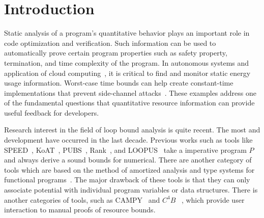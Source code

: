 \section{Introduction}
\label{sec:intro}

Static analysis of a program's quantitative behavior plays an important role in code optimization and verification. 
Such information can be used to automatically prove certain program properties such as safety property, termination, and time complexity of the program. 
In autonomous systems and application of cloud computing~\cite{Carroll:2010:APC:1855840.1855861,Cohen:2012:ET:2398857.2384676}, it is critical to find and monitor static energy usage information. 
Worst-case time bounds
can help create constant-time implementations that prevent side-channel attacks~\cite{Barthe:2014:SNC:2660267.2660283,Kasper:2009:FTR:1617722.1617724}. 
These examples address one of the fundamental questions that quantitative resource information can provide useful feedback for developers.


Research interest in the field of loop bound analysis is quite recent. 
The most and development have occurred in the last decade. 
Previous works such as tools like SPEED~\cite{speed1}, KoAT~\cite{Brockschmidt:2016:ARS:2982214.2866575}, PUBS~\cite{Albert:2012:CAO:2076807.2077025}, Rank~\cite{Alias:2010:MRP:1882094.1882102}, and LOOPUS~\cite{10.1007/978-3-319-08867-9_50} take a
imperative program $P$ and always derive a sound bounds for numerical. 
There are another category of tools which are based on the method
of amortized analysis and type systems for functional programs~\cite{Hoffmann:2012:MAR:2362389.2362393,Hofmann:2003:SPH:604131.604148,Hofmann:2006:TAH:2182132.2182135}. 
The major drawback of these tools is that they
can only associate potential with individual program variables or data structures. 
There is another categories of tools, such as CAMPY~\cite{Srikanth:2017:CVU:3009837.3009864} and $C^{4}B$~\cite{Carbonneaux:2015:CCR:2737924.2737955} , which provide user interaction to manual proofs of resource bounds. 

